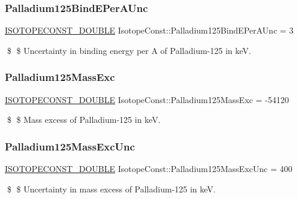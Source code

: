 \subsubsection{\texorpdfstring{Palladium125\+Bind\+E\+Per\+A\+Unc}{Palladium125BindEPerAUnc}}
{\footnotesize\ttfamily \mbox{\hyperlink{group___isotope_const-_macros_ga8f45a7272ce02c0b4c65c44636ed719a}{I\+S\+O\+T\+O\+P\+E\+C\+O\+N\+S\+T\+\_\+\+D\+O\+U\+B\+LE}} Isotope\+Const\+::\+Palladium125\+Bind\+E\+Per\+A\+Unc = 3}

\$ \$ Uncertainty in binding energy per A of Palladium-\/125 in keV. \mbox{\label{group___isotope_const-_palladium-_pd125_ga08347cc113682560874c13b692bc92bf}} 
\subsubsection{\texorpdfstring{Palladium125\+Mass\+Exc}{Palladium125MassExc}}
{\footnotesize\ttfamily \mbox{\hyperlink{group___isotope_const-_macros_ga8f45a7272ce02c0b4c65c44636ed719a}{I\+S\+O\+T\+O\+P\+E\+C\+O\+N\+S\+T\+\_\+\+D\+O\+U\+B\+LE}} Isotope\+Const\+::\+Palladium125\+Mass\+Exc = -\/54120}

\$ \$ Mass excess of Palladium-\/125 in keV. \mbox{\label{group___isotope_const-_palladium-_pd125_ga26c4335b11147a340ed07f5768f9f564}} 
\subsubsection{\texorpdfstring{Palladium125\+Mass\+Exc\+Unc}{Palladium125MassExcUnc}}
{\footnotesize\ttfamily \mbox{\hyperlink{group___isotope_const-_macros_ga8f45a7272ce02c0b4c65c44636ed719a}{I\+S\+O\+T\+O\+P\+E\+C\+O\+N\+S\+T\+\_\+\+D\+O\+U\+B\+LE}} Isotope\+Const\+::\+Palladium125\+Mass\+Exc\+Unc = 400}

\$ \$ Uncertainty in mass excess of Palladium-\/125 in keV. \mbox{\label{group___isotope_const-_palladium-_pd125_gacb1f550b1c465b6d1ba16d886d1ad7a7}} 
